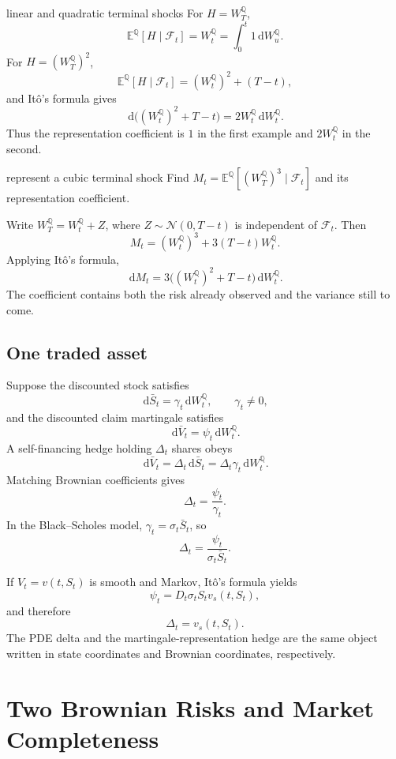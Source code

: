 \documentclass[10pt]{article}
\newcommand{\E}{\mathbb E}
\newcommand{\Q}{\mathbb Q}
\newcommand{\1}{\mathbf 1}
\newcommand{\cF}{\mathcal F}
\newcommand{\dd}{\,\mathrm d}
\newcommand{\Nlaw}{\mathcal N}
\theoremstyle{definition}
\begin{document}
\begin{boardexample}{linear and quadratic terminal shocks}
For \(H=W_T^\Q\),
\[
\E^\Q[H\mid\cF_t]=W_t^\Q
=\int_0^t1\dd W_u^\Q.
\]
For \(H=(W_T^\Q)^2\),
\[
\E^\Q[H\mid\cF_t]=(W_t^\Q)^2+(T-t),
\]
and It\^o's formula gives
\[
\dd\bigl((W_t^\Q)^2+T-t\bigr)=2W_t^\Q\dd W_t^\Q.
\]
Thus the representation coefficient is \(1\) in the first example and
\(2W_t^\Q\) in the second.
\end{boardexample}

\begin{studentexercise}{represent a cubic terminal shock}
Find \(M_t=\E^\Q[(W_T^\Q)^3\mid\cF_t]\) and its representation coefficient.
\end{studentexercise}
\begin{shortsolution}
Write \(W_T^\Q=W_t^\Q+Z\), where
\(Z\sim\Nlaw(0,T-t)\) is independent of \(\cF_t\). Then
\[
M_t=(W_t^\Q)^3+3(T-t)W_t^\Q.
\]
Applying It\^o's formula,
\[
\boxed{
\dd M_t=3\bigl((W_t^\Q)^2+T-t\bigr)\dd W_t^\Q.}
\]
The coefficient contains both the risk already observed and the variance
still to come.
\end{shortsolution}

\subsection{One traded asset}

Suppose the discounted stock satisfies
\[
\dd\bar S_t=\gamma_t\dd W_t^\Q,
\qquad \gamma_t\neq0,
\]
and the discounted claim martingale satisfies
\[
\dd\bar V_t=\psi_t\dd W_t^\Q.
\]
A self-financing hedge holding \(\Delta_t\) shares obeys
\[
\dd\bar V_t=\Delta_t\dd\bar S_t
=\Delta_t\gamma_t\dd W_t^\Q.
\]
Matching Brownian coefficients gives
\[
\boxed{\Delta_t=\frac{\psi_t}{\gamma_t}.}
\]
In the Black--Scholes model,
\(\gamma_t=\sigma_t\bar S_t\), so
\[
\boxed{\Delta_t=\frac{\psi_t}{\sigma_t\bar S_t}.}
\]

If \(V_t=v(t,S_t)\) is smooth and Markov, It\^o's formula yields
\[
\psi_t=D_t\sigma_tS_tv_s(t,S_t),
\]
and therefore
\[
\boxed{\Delta_t=v_s(t,S_t).}
\]
The PDE delta and the martingale-representation hedge are the same object
written in state coordinates and Brownian coordinates, respectively.

\section{Two Brownian Risks and Market Completeness}
\end{document}
